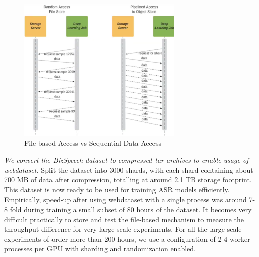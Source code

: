 \begin{figure}[ht]
  \begin{center}
    \includegraphics[width=0.7\textwidth]{images/sequential.png} 
    \caption{File-based Access vs Sequential Data Access \cite{Aizman2019HighLearning}}
    \label{fig:seq}
  \end{center}
\end{figure}

\emph{We convert the BizSpeech dataset to compressed tar archives to enable usage of webdataset.} Split the dataset into 3000 shards, with each shard containing about 700 MB of data after compression, totalling at around 2.1 TB storage footprint. This dataset is now ready to be used for training ASR models efficiently. Empirically, speed-up after using webdataset with a single process was around 7-8 fold during training a small subset of 80 hours of the dataset. It becomes very difficult practically to store and test the file-based mechanism to measure the throughput difference for very large-scale experiments. For all the large-scale experiments of order more than 200 hours, we use a configuration of 2-4 worker processes per GPU with sharding and randomization enabled.

